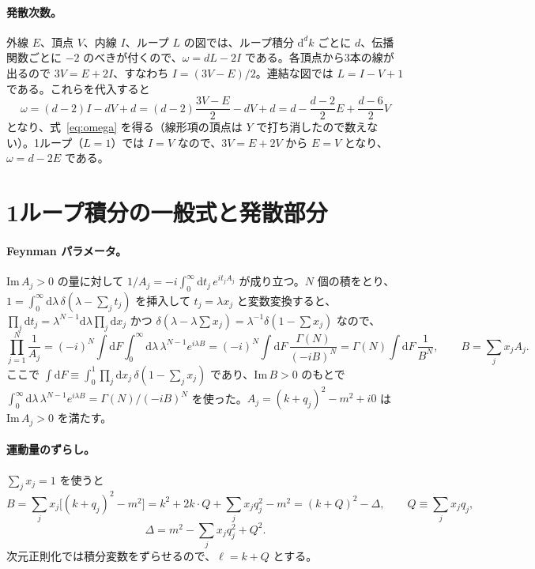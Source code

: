 \documentclass[a4paper,10pt]{ltjsarticle}
\newcommand{\dd}{\mathrm{d}}
\begin{document}
\paragraph{発散次数。}外線 $E$、頂点 $V$、内線 $I$、ループ $L$ の図では、ループ積分 $\dd^dk$ ごとに $d$、伝播関数ごとに $-2$ のべきが付くので、$\omega=dL-2I$ である。各頂点から3本の線が出るので $3V=E+2I$、すなわち $I=(3V-E)/2$。連結な図では $L=I-V+1$ である。これらを代入すると
\begin{equation*}
\omega=(d-2)I-dV+d=(d-2)\frac{3V-E}{2}-dV+d=d-\frac{d-2}{2}E+\frac{d-6}{2}V
\end{equation*}
となり、式~\eqref{eq:omega} を得る（線形項の頂点は $Y$ で打ち消したので数えない）。1ループ（$L=1$）では $I=V$ なので、$3V=E+2V$ から $E=V$ となり、$\omega=d-2E$ である。

\section{1ループ積分の一般式と発散部分}\label{app:integrals}

\paragraph{Feynman パラメータ。}$\mathrm{Im}\,A_j>0$ の量に対して $1/A_j=-i\int_0^\infty\dd t_j\,e^{it_jA_j}$ が成り立つ。$N$ 個の積をとり、$1=\int_0^\infty\dd\lambda\,\delta(\lambda-\sum_jt_j)$ を挿入して $t_j=\lambda x_j$ と変数変換すると、$\prod_j\dd t_j=\lambda^{N-1}\dd\lambda\prod_j\dd x_j$ かつ $\delta(\lambda-\lambda\sum x_j)=\lambda^{-1}\delta(1-\sum x_j)$ なので、
\begin{equation*}
\prod_{j=1}^N\frac{1}{A_j}=(-i)^N\int\!\dd F\int_0^\infty\dd\lambda\,\lambda^{N-1}e^{i\lambda B}
=(-i)^N\int\!\dd F\,\frac{\Gamma(N)}{(-iB)^N}=\Gamma(N)\int\!\dd F\,\frac{1}{B^N},
\qquad B=\sum_jx_jA_j .
\end{equation*}
ここで $\int\dd F\equiv\int_0^1\prod_j\dd x_j\,\delta(1-\sum_jx_j)$ であり、$\mathrm{Im}\,B>0$ のもとで $\int_0^\infty\dd\lambda\,\lambda^{N-1}e^{i\lambda B}=\Gamma(N)/(-iB)^N$ を使った。$A_j=(k+q_j)^2-m^2+i0$ は $\mathrm{Im}\,A_j>0$ を満たす。

\paragraph{運動量のずらし。}$\sum_jx_j=1$ を使うと
\begin{equation*}
B=\sum_jx_j\bigl[(k+q_j)^2-m^2\bigr]=k^2+2k\cdot Q+\sum_jx_jq_j^2-m^2=(k+Q)^2-\Delta,\qquad Q\equiv\sum_jx_jq_j,
\end{equation*}
\begin{equation*}
\Delta=m^2-\sum_jx_jq_j^2+Q^2 .
\end{equation*}
次元正則化では積分変数をずらせるので、$\ell=k+Q$ とする。
\end{document}
